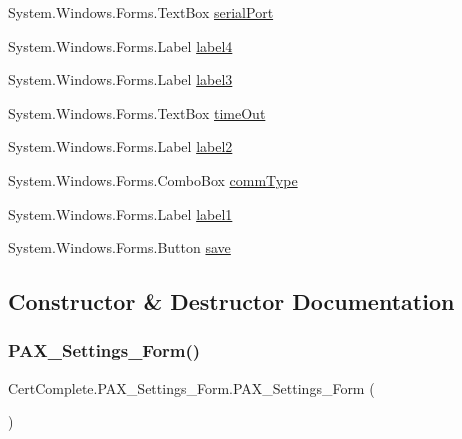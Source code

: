 \begin{DoxyCompactItemize}
\item 
System.\+Windows.\+Forms.\+Text\+Box \mbox{\hyperlink{class_cert_complete_1_1_p_a_x___settings___form_a3e6774091a598d86011bac3af9f2f6f5}{serial\+Port}}
\item 
System.\+Windows.\+Forms.\+Label \mbox{\hyperlink{class_cert_complete_1_1_p_a_x___settings___form_ae62f48ca4935d347d2eba3c17d01f7f6}{label4}}
\item 
System.\+Windows.\+Forms.\+Label \mbox{\hyperlink{class_cert_complete_1_1_p_a_x___settings___form_a3e849a180d3603e5072377ffe1d63319}{label3}}
\item 
System.\+Windows.\+Forms.\+Text\+Box \mbox{\hyperlink{class_cert_complete_1_1_p_a_x___settings___form_ab62fd82f32aa2ee978ed4d5706112671}{time\+Out}}
\item 
System.\+Windows.\+Forms.\+Label \mbox{\hyperlink{class_cert_complete_1_1_p_a_x___settings___form_a0c47e1494c1cfebdc32659ccdd8cfe32}{label2}}
\item 
System.\+Windows.\+Forms.\+Combo\+Box \mbox{\hyperlink{class_cert_complete_1_1_p_a_x___settings___form_aed66a6ab3695bc84763f284e063fa581}{comm\+Type}}
\item 
System.\+Windows.\+Forms.\+Label \mbox{\hyperlink{class_cert_complete_1_1_p_a_x___settings___form_a0e2f01bb7736572c8b1f818d96e991ea}{label1}}
\item 
System.\+Windows.\+Forms.\+Button \mbox{\hyperlink{class_cert_complete_1_1_p_a_x___settings___form_a3e1ee1f4994b27c1ea45ecf7ed2d725f}{save}}
\end{DoxyCompactItemize}


\subsection{Constructor \& Destructor Documentation}
\mbox{\label{class_cert_complete_1_1_p_a_x___settings___form_aff958ced6137ee535b58d3f21feddd4a}} 
\subsubsection{\texorpdfstring{P\+A\+X\+\_\+\+Settings\+\_\+\+Form()}{PAX\_Settings\_Form()}\hspace{0.1cm}{\footnotesize\ttfamily [1/2]}}
{\footnotesize\ttfamily Cert\+Complete.\+P\+A\+X\+\_\+\+Settings\+\_\+\+Form.\+P\+A\+X\+\_\+\+Settings\+\_\+\+Form (\begin{DoxyParamCaption}{ }\end{DoxyParamCaption})\hspace{0.3cm}{\ttfamily [inline]}}



